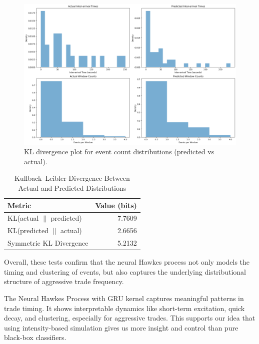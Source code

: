 \begin{figure}[H]
    \centering
    \includegraphics[width=0.95\linewidth]{figures/KL_181330.png}
    \caption{KL divergence plot for event count distributions (predicted vs actual).}
    \label{fig:kl-divergence}
\end{figure}

\begin{table}[H]
    \centering
    \caption{Kullback--Leibler Divergence Between Actual and Predicted Distributions}
    \label{tb:kl-divergence}
    \begin{tabular}{lr}
    \toprule
    \textbf{Metric} & \textbf{Value (bits)} \\
    \midrule
    KL(actual $\parallel$ predicted) & 7.7609 \\
    KL(predicted $\parallel$ actual) & 2.6656 \\
    Symmetric KL Divergence & 5.2132 \\
    \bottomrule
    \end{tabular}
\end{table}


Overall, these tests confirm that the neural Hawkes process not only models the timing and clustering of events, but also captures the underlying distributional structure of aggressive trade frequency.

The Neural Hawkes Process with GRU kernel captures meaningful patterns in trade timing. It shows interpretable dynamics like short-term excitation, quick decay, and clustering, especially for aggressive trades. This supports our idea that using intensity-based simulation gives us more insight and control than pure black-box classifiers.









